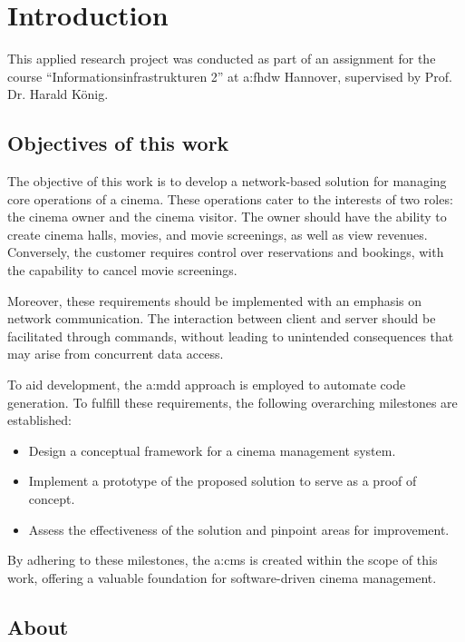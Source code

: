 \chapter{Introduction}
\label{ch:intro}

This applied research project was conducted as part of an assignment for the course \enquote{Informationsinfrastrukturen 2} at \gls{a:fhdw} Hannover, supervised by Prof. Dr. Harald König.

\section{Objectives of this work}

The objective of this work is to develop a network-based solution for managing core operations of a cinema. These operations cater to the interests of two roles: the cinema owner and the cinema visitor. The owner should have the ability to create cinema halls, movies, and movie screenings, as well as view revenues. Conversely, the customer requires control over reservations and bookings, with the capability to cancel movie screenings.

Moreover, these requirements should be implemented with an emphasis on network communication. The interaction between client and server should be facilitated through commands, without leading to unintended consequences that may arise from concurrent data access.

To aid development, the \gls{a:mdd} approach is employed to automate code generation. To fulfill these requirements, the following overarching milestones are established:

\begin{itemize}
\item Design a conceptual framework for a cinema management system.
\item Implement a prototype of the proposed solution to serve as a proof of concept.
\item Assess the effectiveness of the solution and pinpoint areas for improvement.
\end{itemize}

By adhering to these milestones, the \gls{a:cms} is created within the scope of this work, offering a valuable foundation for software-driven cinema management.

\section{About }

